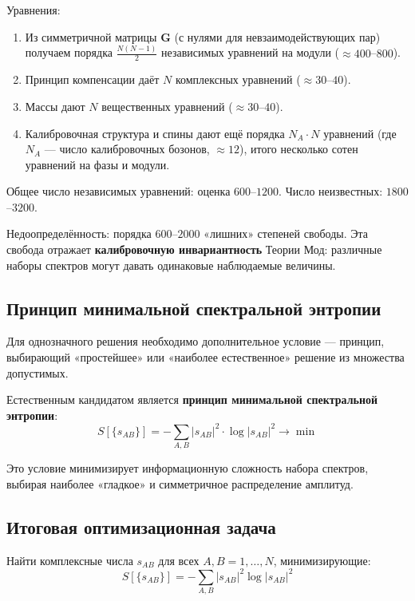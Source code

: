 \documentclass[12pt,a4paper]{article}
\begin{document}
Уравнения:

\begin{enumerate}[label=(\arabic*)]
    \item Из симметричной матрицы $\mathbf{G}$ (с нулями для невзаимодействующих пар) получаем порядка $\frac{N(N-1)}{2}$ независимых уравнений на модули ($\approx 400$--$800$).
    \item Принцип компенсации даёт $N$ комплексных уравнений ($\approx 30$--$40$).
    \item Массы дают $N$ вещественных уравнений ($\approx 30$--$40$).
    \item Калибровочная структура и спины дают ещё порядка $N_A \cdot N$ уравнений (где $N_A$ --- число калибровочных бозонов, $\approx 12$), итого несколько сотен уравнений на фазы и модули.
\end{enumerate}

Общее число независимых уравнений: оценка $600$--$1200$. Число неизвестных: $1800$--$3200$.

Недоопределённость: порядка $600$--$2000$ «лишних» степеней свободы. Эта свобода отражает \textbf{калибровочную инвариантность} Теории Мод: различные наборы спектров могут давать одинаковые наблюдаемые величины.

\subsection{Принцип минимальной спектральной энтропии}
Для однозначного решения необходимо дополнительное условие --- принцип, выбирающий «простейшее» или «наиболее естественное» решение из множества допустимых.

Естественным кандидатом является \textbf{принцип минимальной спектральной энтропии}:
\begin{equation}
    S[\{s_{AB}\}] = -\sum_{A,B} |s_{AB}|^2 \cdot \log|s_{AB}|^2 \to \min
\end{equation}

Это условие минимизирует информационную сложность набора спектров, выбирая наиболее «гладкое» и симметричное распределение амплитуд.

\subsection{Итоговая оптимизационная задача}
Найти комплексные числа $s_{AB}$ для всех $A, B = 1, \dots, N$, минимизирующие:
\begin{equation}
    S[\{s_{AB}\}] = -\sum_{A,B} |s_{AB}|^2 \log|s_{AB}|^2
\end{equation}
\end{document}
